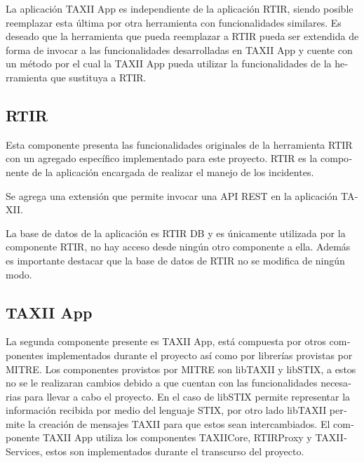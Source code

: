 	\foreignlanguage{spanish}{La aplicación TAXII App es independiente de la aplicación RTIR, siendo posible reemplazar esta
		última por otra herramienta con funcionalidades similares. Es deseado que la herramienta que pueda reemplazar a RTIR
		pueda ser extendida de forma de invocar a las funcionalidades desarrolladas en TAXII App y cuente con un método por el
		cual la TAXII App pueda utilizar la funcionalidades de la herramienta que sustituya a RTIR.}
	
	\subsection[RTIR]{\foreignlanguage{spanish}{RTIR}}
	\foreignlanguage{spanish}{Esta componente presenta las funcionalidades originales de la herramienta RTIR con un agregado
		específico implementado para este proyecto. RTIR es la componente de la aplicación encargada de realizar el manejo de
		los incidentes.}
	
	\foreignlanguage{spanish}{Se agrega una extensión que permite invocar una API REST en la aplicación TAXII. \ }
	
	\foreignlanguage{spanish}{La base de datos de la aplicación es RTIR DB y es únicamente utilizada por la componente RTIR,
		no hay acceso desde ningún otro componente a ella. Además es importante destacar que la base de datos de RTIR no se
		modifica de ningún modo.}
	
	
	\bigskip
	
	\subsection[TAXII App\ \ \ \ \ \ \ \ ]{\foreignlanguage{spanish}{TAXII App\ \ \ \ \ \ \ \ }}
	
	\bigskip
	
	\foreignlanguage{spanish}{La segunda componente presente es TAXII App, está compuesta por otros componentes
		implementados durante el proyecto así como por librerías provistas por MITRE. Los componentes provistos por MITRE son
		libTAXII y libSTIX, a estos no se le realizaran cambios debido a que cuentan con las funcionalidades necesarias para
		llevar a cabo el proyecto. En el caso de libSTIX permite representar la información recibida por medio del lenguaje
		STIX, por otro lado libTAXII permite la creación de mensajes TAXII para que estos sean intercambiados. El componente
		TAXII App utiliza los componentes TAXIICore, RTIRProxy y TAXIIServices, estos son implementados durante el transcurso
		del proyecto. }
	
